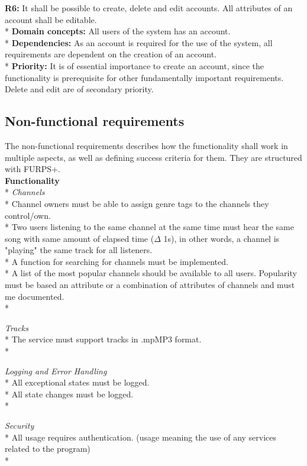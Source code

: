 \documentclass[a4paper,11pt,report]{article}
\begin{document}
\textbf{R6:}
It shall be possible to create, delete and edit accounts. All attributes of an account shall be editable. \\*
\textbf{Domain concepts:}
All users of the system has an account. \\*
\textbf{Dependencies:}
As an account is required for the use of the system, all requirements are dependent on the creation of an account. \\*
\textbf{Priority:} 
It is of essential importance to create an account, since the functionality is prerequisite for other fundamentally important requirements. Delete and edit are of secondary priority.

\subsection{Non-functional requirements}
The non-functional requirements describes how the functionality shall work in multiple aspects, as well as defining success criteria for them. They are structured with FURPS+. \\

\textbf{Functionality} \\*
\textit{Channels} \\*
Channel owners must be able to assign genre tags to the channels they control/own. \\*
Two users listening to the same channel at the same time must hear the same song with same amount of elapsed time (\(\Delta\) 1s), in other words, a channel is "playing" the same track for all listeners. \\*
A function for searching for channels must be implemented. \\*
A list of the most popular channels should be available to all users. Popularity must be based an attribute or a combination of attributes of channels and must me documented. \\*

\textit{Tracks} \\*
The service must support tracks in .mpMP3 format. \\*

\textit{Logging and Error Handling} \\*
All exceptional states must be logged.\\*
All state changes must be logged.\\*

\textit{Security} \\*
All usage requires authentication. (usage meaning the use of any services related to the program)\\*
\end{document}
